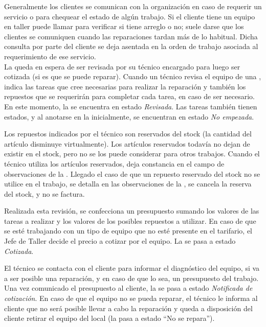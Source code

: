 \documentclass[12pt]{extarticle}
\begin{document}
\begin{spacing}{1.2}
    Generalmente los clientes se comunican con la organización en caso de requerir un servicio o para chequear el estado de algún trabajo. Si el cliente tiene un equipo en taller puede llamar para verificar si tiene arreglo o no; suele darse que los clientes se comuniquen cuando las reparaciones tardan más de lo habitual. Dicha consulta por parte del cliente se deja asentada en la orden de trabajo asociada al requerimiento de ese servicio.\\

    La \OT{} queda en espera de ser revisada por su técnico encargado para luego ser cotizada (si es que se puede reparar).
    Cuando un técnico revisa el equipo de una \OT{}, indica las tareas que cree necesarias para realizar la reparación y también los repuestos que se requerirán para completar cada tarea, en caso de ser necesario. En este momento, la \OT{} se encuentra en estado \textit{Revisada}. Las tareas también tienen estados, y al anotarse en la \OT{} inicialmente, se encuentran en estado \textit{No empezada}.
    
    Los repuestos indicados por el técnico son reservados del stock (la cantidad del artículo disminuye virtualmente). Los artículos reservados todavía no dejan de existir en el stock, pero no se los puede considerar para otros trabajos. Cuando el técnico utiliza los artículos reservados, deja constancia en el campo de observaciones de la \OT{}.  Llegado el caso de que un repuesto reservado del stock no se utilice en el trabajo, se detalla en las observaciones de la \OT{}, se cancela la reserva del stock, y no se factura.

    Realizada esta revisión, se confecciona un presupuesto sumando los valores de las tareas a realizar y los valores de los posibles repuestos a utilizar. En caso de que se esté trabajando con un tipo de equipo que no esté presente en el tarifario, el Jefe de Taller decide el precio a cotizar por el equipo. La \OT{} se pasa a estado \textit{Cotizada}.
    
    El técnico se contacta con el cliente para informar el diagnóstico del equipo, si va a ser posible una reparación, y en caso de que lo sea, un presupuesto del trabajo. Una vez comunicado el presupuesto al cliente, la \OT{} se pasa a estado \textit{Notificada de cotización}. En caso de que el equipo no se pueda reparar, el técnico le informa al cliente que no será posible llevar a cabo la reparación y queda a disposición del cliente retirar el equipo del local (la \OT{} pasa a estado ``No se repara'').
  

\end{spacing}
\end{document}
